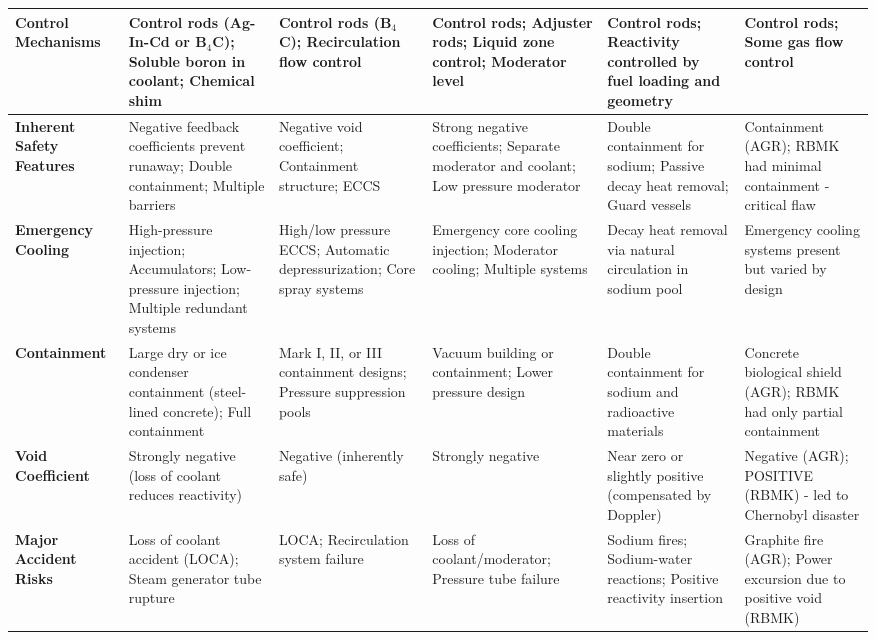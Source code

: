 \documentclass{article}
\begin{document}
\begin{longtable}{>{\raggedright\arraybackslash}p{3.5cm}*{5}{>{\raggedright\arraybackslash}p{3.2cm}}}
\textbf{Control Mechanisms} & Control rods (Ag-In-Cd or B$_4$C); Soluble boron in coolant; Chemical shim & Control rods (B$_4$C); Recirculation flow control & Control rods; Adjuster rods; Liquid zone control; Moderator level & Control rods; Reactivity controlled by fuel loading and geometry & Control rods; Some gas flow control \\
\midrule

\textbf{Inherent Safety Features} & Negative feedback coefficients prevent runaway; Double containment; Multiple barriers & Negative void coefficient; Containment structure; ECCS & Strong negative coefficients; Separate moderator and coolant; Low pressure moderator & Double containment for sodium; Passive decay heat removal; Guard vessels & Containment (AGR); RBMK had minimal containment - critical flaw \\
\midrule

\textbf{Emergency Cooling} & High-pressure injection; Accumulators; Low-pressure injection; Multiple redundant systems & High/low pressure ECCS; Automatic depressurization; Core spray systems & Emergency core cooling injection; Moderator cooling; Multiple systems & Decay heat removal via natural circulation in sodium pool & Emergency cooling systems present but varied by design \\
\midrule

\textbf{Containment} & Large dry or ice condenser containment (steel-lined concrete); Full containment & Mark I, II, or III containment designs; Pressure suppression pools & Vacuum building or containment; Lower pressure design & Double containment for sodium and radioactive materials & Concrete biological shield (AGR); RBMK had only partial containment \\
\midrule

\textbf{Void Coefficient} & Strongly negative (loss of coolant reduces reactivity) & Negative (inherently safe) & Strongly negative & Near zero or slightly positive (compensated by Doppler) & Negative (AGR); POSITIVE (RBMK) - led to Chernobyl disaster \\
\midrule

\textbf{Major Accident Risks} & Loss of coolant accident (LOCA); Steam generator tube rupture & LOCA; Recirculation system failure & Loss of coolant/moderator; Pressure tube failure & Sodium fires; Sodium-water reactions; Positive reactivity insertion & Graphite fire (AGR); Power excursion due to positive void (RBMK) \\
\midrule


\end{longtable}
\end{document}
